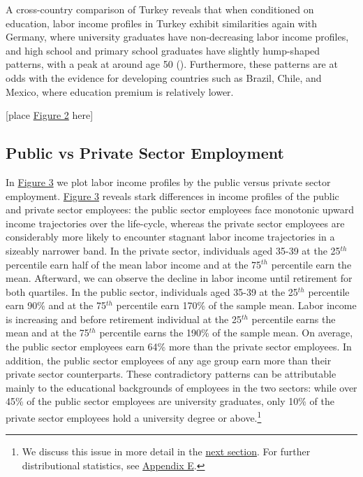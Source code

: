 \documentclass[12pt,author-year]{article}
\begin{document}
A cross-country comparison of Turkey reveals that when conditioned on education, labor income profiles in Turkey exhibit similarities again with Germany, where university graduates have non-decreasing labor income profiles, and high school and primary school graduates have slightly hump-shaped patterns, with a peak at around age 50 (\citealp{Lagakos}). Furthermore, these patterns are at odds with the evidence for developing countries such as Brazil, Chile, and Mexico, where education premium is relatively lower. 

\begin{center}
	[place \hyperref[figure2]{Figure 2} here]
\end{center}

\subsection{Public vs Private Sector Employment}
In \hyperref[figure3]{Figure 3} we plot labor income profiles by the public versus private sector employment. \hyperref[figure3]{Figure 3} reveals stark differences in income profiles of the public and private sector employees: the public sector employees face monotonic upward income trajectories over the life-cycle, whereas the private sector employees are considerably more likely to encounter stagnant labor income trajectories in a sizeably narrower band. In the private sector, individuals aged 35-39 at the 25$^{th}$ percentile earn half of the mean labor income and at the 75$^{th}$ percentile earn the mean. Afterward, we can observe the decline in labor income until retirement for both quartiles. In the public sector, individuals aged 35-39 at the 25$^{th}$ percentile earn 90\% and at the 75$^{th}$ percentile earn 170\% of the sample mean. Labor income is increasing and before retirement individual at the 25$^{th}$ percentile earns the mean and at the 75$^{th}$ percentile earns the 190\% of the sample mean. On average, the public sector employees earn 64\% more than the private sector employees. In addition, the public sector employees of any age group earn more than their private sector counterparts. These contradictory patterns can be attributable mainly to the educational backgrounds of employees in the two sectors: while over 45\% of the public sector employees are university graduates, only 10\% of the private sector employees hold a university degree or above.\footnote{We discuss this issue in more detail in the \hyperref[sectioneduc]{next section}. For further distributional statistics, see \hyperref[AppendixE]{Appendix E}.}
\end{document}
